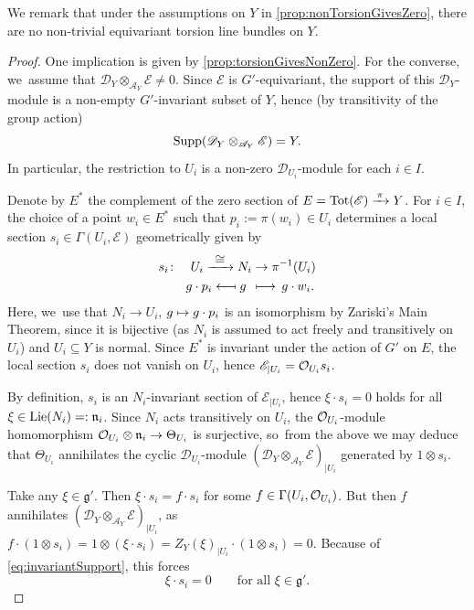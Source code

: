 \documentclass[11pt]{article}
\newcommand\mto{\mathchoice{\longmapsto}{\mapsto}{\mapsto}{\mapsto}}
\newcommand{\To}[1]{\mathchoice{\xrightarrow{\textstyle\kern4pt#1\kern3pt}}{\xrightarrow{\,#1\,}}{}{}}
\newcommand\from{\mathchoice{\longleftarrow}{\leftarrow}{\leftarrow}{\leftarrow}}
\newcommand\mfrom{\mathrel{\from\joinrel\mapstochar}}
\newcommand{\cA}{\mathscr{A}}
\newcommand{\frg}{\mathfrak{g}}
\DeclareMathOperator{\Lie}{\textup{Lie}}
\DeclareMathOperator{\Supp}{\textup{Supp}}
\DeclareMathOperator{\Tot}{Tot}
\newcommand\restr[2]{{#1_{| {#2}}}}
\begin{document}
We remark that under the assumptions on $Y$ in \cref{prop:nonTorsionGivesZero}, there are no non-trivial equivariant torsion line bundles on $Y$.

\begin{proof}
One implication is given by \cref{prop:torsionGivesNonZero}. For the converse, we~assume that $\mathscr{D}_Y \otimes_{\cA_Y} \mathscr{E} \neq 0$. Since $\mathscr{E}$ is $G'$-equivariant, the support of this $\mathscr{D}_Y$\nobreakdash-mod\-ule is a non-empty $G'$-invariant subset of $Y$, hence (by transitivity of the group action)
\begin{equation} \label{eq:invariantSupport}
\Supp(\mathscr{D}_Y \otimes_{\cA_Y} \mathscr{E}) = Y.
\end{equation}
In particular, the restriction to $U_i$ is a non-zero $\mathscr{D}_{U_i}$\nobreakdash-mod\-ule for each $i \in I$.

Denote by $E^*$ the complement of the zero section of $E = \Tot(\mathscr E) \To{\pi} Y$. For $i \in I$, the choice of a point $w_i \in E^*$ such that $p_i := \pi(w_i) \in U_i$ determines a local section $s_i \in \Gamma(U_i, \mathscr E)$ geometrically given by
\begin{align*}
s_i \colon \quad U_i \To{\cong} N_i& \to \pi^{-1}(U_i) \\
g \cdot p_i \mfrom\, g\;\,& \mto \,g \cdot w_i.
\end{align*}
Here, we~use that $N_i \to U_i$, $g \mto g \cdot p_i$ is an isomorphism by Zariski's Main Theorem, since it is bijective (as $N_i$ is assumed to act freely and transitively on $U_i$) and $U_i \subseteq Y$ is normal. Since $E^*$ is invariant under the action of $G'$ on $E$, the local section $s_i$ does not vanish on $U_i$, hence $\restr{\mathscr{E}}{U_i} = \O_{U_i} s_i$.

By definition, $s_i$ is an $N_i$-invariant section of $\restr{\mathscr{E}}{U_i}$, hence $\xi \cdot s_i = 0$ holds for all $\xi \in \Lie(N_i) =: \mathfrak n_i$. Since $N_i$ acts transitively on $U_i$, the $\mathcal{O}_{U_i}$\nobreakdash-mod\-ule homomorphism $\mathcal{O}_{U_i} \otimes \mathfrak n_i \to \Theta_{U_i}$ is surjective, so~from the above we may deduce that $\Theta_{U_i}$ annihilates the cyclic $\mathscr{D}_{U_i}$\nobreakdash-mod\-ule $\restr{(\mathscr{D}_Y \otimes_{\cA_Y} \mathscr{E})}{U_i}$ generated by $1 \otimes s_i$.

Take any $\xi \in \frg'$. Then $\xi \cdot s_i = f \cdot s_i$ for some $f \in \Gamma(U_i,\mathcal{O}_{U_i})$. But then $f$ annihilates $\restr{(\mathscr{D}_Y \otimes_{\cA_Y} \mathscr{E})}{U_i}$, as $f \cdot (1 \otimes s_i) = 1 \otimes (\xi \cdot s_i) = \restr{Z_Y(\xi)}{U_i} \cdot (1 \otimes s_i) = 0$. Because of \eqref{eq:invariantSupport}, this forces
\[
\xi \cdot s_i = 0 \qquad \text{for all }\xi \in \frg'.
\]


\end{proof}
\end{document}

